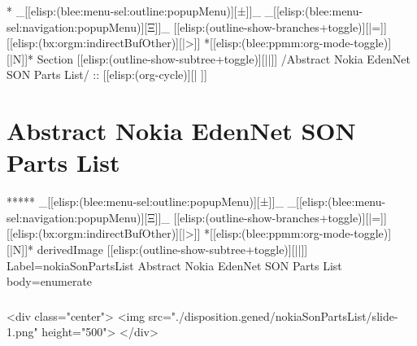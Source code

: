\begin{whenOrg}
\begin{verblatex}
\begin{frame}[fragile,plain,label=nokiSonEcosystemFig]
\end{frame}
\end{verblatex}


\begin{whenOrg}
*  _[[elisp:(blee:menu-sel:outline:popupMenu)][±]]_ _[[elisp:(blee:menu-sel:navigation:popupMenu)][Ξ]]_ [[elisp:(outline-show-branches+toggle)][|=]] [[elisp:(bx:orgm:indirectBufOther)][|>]] *[[elisp:(blee:ppmm:org-mode-toggle)][|N]]*  Section    [[elisp:(outline-show-subtree+toggle)][||]]   /Abstract Nokia EdenNet SON Parts List/ ::  [[elisp:(org-cycle)][| ]]
\end{whenOrg}

\section{Abstract Nokia EdenNet SON Parts List}

\begin{whenOrg}
*****  _[[elisp:(blee:menu-sel:outline:popupMenu)][±]]_ _[[elisp:(blee:menu-sel:navigation:popupMenu)][Ξ]]_ [[elisp:(outline-show-branches+toggle)][|=]] [[elisp:(bx:orgm:indirectBufOther)][|>]] *[[elisp:(blee:ppmm:org-mode-toggle)][|N]]*  derivedImage [[elisp:(outline-show-subtree+toggle)][||]] Label=nokiaSonPartsList Abstract Nokia EdenNet SON Parts List body=enumerate
\end{whenOrg}

\begin{htmlonly}

\begin{frame}[fragile,plain,label=nokiaSonPartsList]
    \frametitle{}
    \framesubtitle{}
    \begin{rawhtml}
<div class="center">
<img src="./disposition.gened/nokiaSonPartsList/slide-1.png" height="500">
</div>
    \end{rawhtml}
\end{frame}
\end{htmlonly}

\begin{verblatex}


\end{verblatex}
\end{whenOrg}
